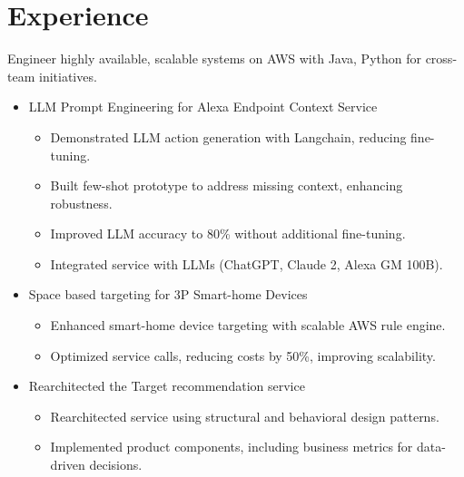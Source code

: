\section{Experience}
{Engineer highly available, scalable systems on AWS with Java, Python for cross-team initiatives.\newline{}
\begin{itemize}
\setlength\itemsep{1em}
    \item LLM Prompt Engineering for Alexa Endpoint Context Service
        \begin{itemize}
            \item Demonstrated LLM action generation with Langchain, reducing fine-tuning.
            \item Built few-shot prototype to address missing context, enhancing robustness.
            \item Improved LLM accuracy to 80\% without additional fine-tuning.
            \item Integrated service with LLMs (ChatGPT, Claude 2, Alexa GM 100B).
        \end{itemize}
    \item Space based targeting for 3P Smart-home Devices
    \begin{itemize}
        \item Enhanced smart-home device targeting with scalable AWS rule engine.
        \item Optimized service calls, reducing costs by 50\%, improving scalability.
    \end{itemize}
    \item Rearchitected the Target recommendation service
        \begin{itemize}
            \item Rearchitected service using structural and behavioral design patterns.
            \item Implemented product components, including business metrics for data-driven decisions.
        \end{itemize}
\end{itemize}}

